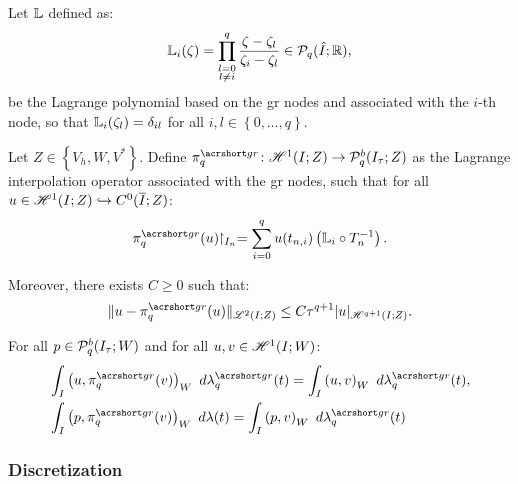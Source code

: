 \begin{definition}
    Let $\mathbb{L}$ defined as:
    \begin{align}
        \mathbb{L}_i (\zeta) = \prod_{\substack{l = 0 \\ l \neq i}}^q \frac{\zeta - \zeta_l}{\zeta_i - \zeta_l} \in \mathcal{P}_{q}(\hat{I}; \mathbb{R}),
    \end{align}
    be the Lagrange polynomial based on the \acrshort{gr} nodes and associated with the $i$-th node, so that $\mathbb{L}_i (\zeta_l) = \delta_{i l}$ for all $i, l \in \left\{ 0, \dots, q\right\}$.
\end{definition}

\begin{definition}[$\InterpolantGR_q$] \label{def:interpolant_gr}
    Let $Z \in \left\{V_h, W, V^* \right\}$. Define $\InterpolantGR_q \colon \SpaceHk{1}(I; Z) \rightarrow \SpacePolynomials{q}^b(\TimeMesh; Z)$ as the Lagrange interpolation operator associated with the \acrshort{gr} nodes, such that for all $u \in \mathscr{H}^{1}(I; Z) \hookrightarrow C^0(\overline{I}; Z)$:
    \begin{align}
        \InterpolantGR_q(u) \Restriction_{I_n} = \sum_{i = 0}^q u(t_{n, i}) \left( \Lagrange_i \circ T_n^{-1} \right).
    \end{align}

    Moreover, there exists $C \geq 0$ such that:
    \begin{align}
        \lVert u - \InterpolantGR_q(u) \rVert_{\SpaceLp{2}(I; Z)} \leq C \tau^{q + 1} \lvert u \rvert_{\SpaceHk{q + 1}(I; Z)}.
    \end{align}
\end{definition}

\begin{proposition}
    For all $p \in \mathcal{P}_{q}^b(I_{\tau}; W)$ and for all $u, v \in \mathscr{H}^{1}(I; W)$:
    \begin{align}
        & \int_I \left( u, \InterpolantGR_q(v) \right)_W ~ d \lambdaGR_q(t) = \int_I \left( u, v \right)_W ~ d \lambdaGR_q(t), \\
        & \int_I \left( p, \InterpolantGR_q(v) \right)_W ~ d \lambda(t) = \int_I \left( p, v \right)_W ~ d \lambdaGR_q(t)
    \end{align}
\end{proposition}

\subsubsection{Discretization}

